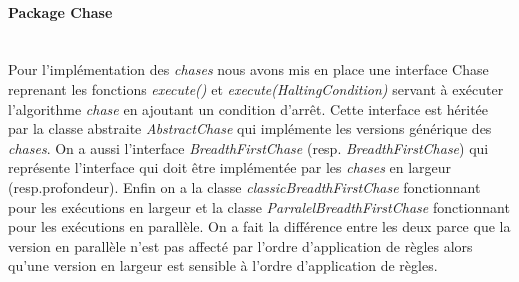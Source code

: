    \paragraph{Package Chase}\ \\
    Pour l'implémentation des \textit{chases} nous avons mis en place une interface Chase reprenant les fonctions \textit{execute()} et \textit{execute(HaltingCondition)} servant à exécuter l'algorithme \textit{chase} en ajoutant un condition d'arrêt.
    Cette interface est héritée par la classe abstraite \textit{AbstractChase} qui implémente les versions générique des \textit{chases}. On a aussi l'interface \textit{BreadthFirstChase} (resp. \textit{BreadthFirstChase}) qui représente l'interface qui doit être implémentée par les \textit{chases} en largeur (resp.profondeur).
    Enfin on a la classe \textit{classicBreadthFirstChase} fonctionnant pour les exécutions en largeur et la classe \textit{ParralelBreadthFirstChase} fonctionnant pour les exécutions en parallèle. On a fait la différence entre les deux parce que la version en parallèle n’est pas affecté par l’ordre d’application de règles alors qu'une version en largeur est sensible à l’ordre d’application de règles.
        
